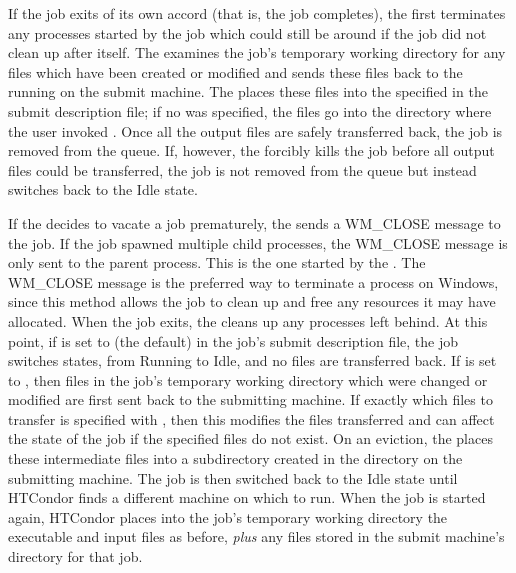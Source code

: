 If the job exits of its own accord (that is, the job completes),
the 
first terminates any processes started by the job which could still be
around if the job did not clean up after itself.
The  examines the job's temporary working directory for any
files which have been created or modified and sends these files back
to the  running on the submit machine.
The 
places these files into the  specified in the
submit description file; 
if no  was specified,
the files go into the directory where the user invoked .
Once all the output files are safely transferred back,
the job is removed from the queue.
If, however, the  forcibly kills the job before all output files
could be transferred, the job is not removed from the queue but instead
switches back to the Idle state.  

If the  decides to vacate a job prematurely,
the  sends a WM\_CLOSE message to the job.
If the job spawned multiple child processes, the WM\_CLOSE message is only
sent to the parent process.
This is the one started by the .
The WM\_CLOSE message is the preferred way to terminate a process on Windows,
since this method allows the job to clean up and free any resources it may
have allocated.
When the job exits, the  cleans up any processes left behind.
At this point, if  is set to
 (the default) in the job's submit description file,
the job switches states, from Running to Idle,
and no files are transferred back.
If  is set to 
,
then files
in the job's temporary working directory which were changed or modified are
first sent back to the submitting machine.
If exactly which files to transfer is specified with
,
then this modifies the files transferred
and can affect the state of the job if the specified files do not exist.
On an eviction, the  places these
intermediate files into a subdirectory created in the
 directory on the submitting machine.
The job is then switched back to the Idle state until HTCondor finds
a different machine on which to run.
When the job is started again,
HTCondor places into the job's temporary working directory the executable
and input files as before,
\emph{plus} any files stored in the submit machine's  directory for that job.  

